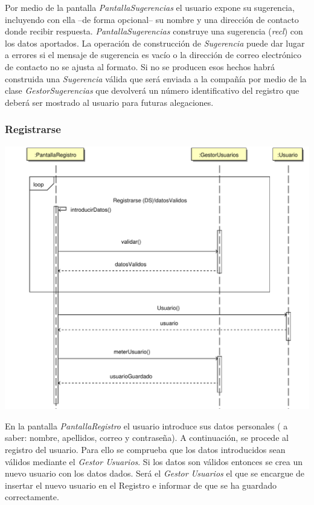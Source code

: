 \documentclass[11pt, a4paper, twoside, titlepage]{article}
\begin{document}
				Por medio de la pantalla {\itshape PantallaSugerencias} el usuario expone su sugerencia, incluyendo con ella --de forma opcional-- su nombre y una dirección de contacto donde recibir respuesta. {\itshape PantallaSugerencias} construye una sugerencia ({\itshape recl}) con los datos aportados. La operación de construcción de {\itshape Sugerencia} puede dar lugar a errores si el mensaje de sugerencia es vacío o la dirección de correo electrónico de contacto no se ajusta al formato. Si no se producen esos hechos habrá construida una {\itshape Sugerencia} válida que será enviada a la compañía por medio de la clase {\itshape GestorSugerencias} que devolverá un número identificativo del registro que deberá ser mostrado al usuario para futuras alegaciones.

			\subsubsection{Registrarse}
				\begin{center}
					\includegraphics[scale=.5]{diseno/diagramas/registrarse.pdf}
				\end{center}
				
				En la pantalla {\itshape PantallaRegistro} el usuario introduce sus datos personales ( a saber: nombre, apellidos, correo y contraseña).  A continuación, se procede al registro del usuario. Para ello se comprueba que los datos introducidos sean válidos mediante el  {\itshape Gestor Usuarios}. Si los datos son válidos entonces se crea un nuevo usuario con los datos dados. Será el  {\itshape Gestor Usuarios} el que se encargue de insertar el nuevo usuario en el Registro  e informar de que se ha guardado correctamente.
\end{document}

